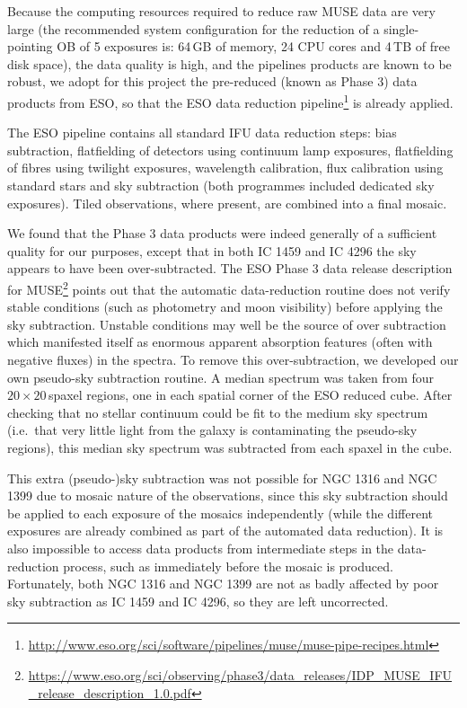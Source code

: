 		Because the computing resources required to reduce raw MUSE data are very large (the recommended system configuration for the reduction of a single-pointing OB of 5 exposures is: 64\,GB of memory, 24 CPU cores and 4\,TB of free disk space), the data quality is high, and the pipelines products are known to be robust, we adopt for this project the pre-reduced (known as Phase 3) data products from ESO, so that the ESO data reduction pipeline\footnote{\url{http://www.eso.org/sci/software/pipelines/muse/muse-pipe-recipes.html}} is already applied. 

		The ESO pipeline contains all standard IFU data reduction steps: bias subtraction, flatfielding of detectors using continuum lamp exposures, flatfielding of fibres using twilight exposures, wavelength calibration, flux calibration using standard stars and sky subtraction (both programmes included dedicated sky exposures). Tiled observations, where present, are combined into a final mosaic.

		We found that the Phase 3 data products were indeed generally of a sufficient quality for our purposes, except that in both IC 1459 and IC 4296 the sky appears to have been over-subtracted. The ESO Phase 3 data release description for MUSE\footnote{\url{https://www.eso.org/sci/observing/phase3/data\_releases/IDP\_MUSE\_IFU\_release\_description\_1.0.pdf}} points out that the automatic data-reduction routine does not verify stable conditions (such as photometry and moon visibility) before applying the sky subtraction. Unstable conditions may well be the source of over subtraction which manifested itself as enormous apparent absorption features (often with negative fluxes) in the spectra. To remove this over-subtraction, we developed our own pseudo-sky subtraction routine. A median spectrum was taken from four $20 \times 20$\,spaxel regions, one in each spatial corner of the ESO reduced cube. After checking that no stellar continuum could be fit to the medium sky spectrum (i.e.\ that very little light from the galaxy is contaminating the pseudo-sky regions), this median sky spectrum was subtracted from each spaxel in the cube. 

		This extra (pseudo-)sky subtraction was not possible for NGC 1316 and NGC 1399 due to mosaic nature of the observations, since this sky subtraction should be applied to each exposure of the mosaics independently (while the different exposures are already combined as part of the automated data reduction). It is also impossible to access data products from intermediate steps in the data-reduction process, such as immediately before the mosaic is produced. Fortunately, both NGC 1316 and NGC 1399 are not as badly affected by poor sky subtraction as IC 1459 and IC 4296, so they are left uncorrected. 

